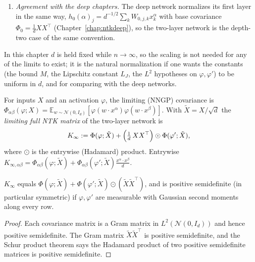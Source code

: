 \begin{remark}
\begin{enumerate}
  \item \emph{Agreement with the deep chapters.} The deep network normalizes its first layer in the same way, $h_0(\alpha)_j=d^{-1/2}\sum_kW_{0,j,k}x^\alpha_k$ with base
  covariance $\Phi_0=\tfrac1dXX^\top$ (Chapter~\ref{chap:ntkdeep}), so the two-layer network is the depth-two case of the same convention.
\end{enumerate}
In this chapter $d$ is held fixed while $n\to\infty$, so the scaling is not needed for any of the limits to exist; it is the natural normalization if one wants the constants
(the bound $M$, the Lipschitz constant $L_J$, the $L^2$ hypotheses on $\varphi,\varphi'$) to be uniform in $d$, and for comparing with the deep networks.
\end{remark}

\begin{definition}\label{def:ntktl:shallowLimitingNTK}
  \leanok
For inputs $X$ and an activation $\varphi$, the limiting (NNGP) covariance is $\Phi_{\alpha\beta}(\varphi;X)=\mathbb E_{w\sim\mathcal N(0,I_d)}[\varphi(w\cdot x^\alpha)\varphi(w\cdot x^\beta)]$. With $\tilde X=X/\sqrt d$ the
\emph{limiting full NTK matrix} of the two-layer network is
\[
  K_\infty:=\Phi(\varphi;\tilde X)+\Bigl(\tfrac1d\,XX^\top\Bigr)\odot\Phi(\varphi';\tilde X),
\]
where $\odot$ is the entrywise (Hadamard) product. Entrywise $K_{\infty,\alpha\beta}=\Phi_{\alpha\beta}(\varphi;\tilde X)+\Phi_{\alpha\beta}(\varphi';\tilde X)\frac{x^\alpha\cdot x^\beta}{d}$.
\end{definition}

\begin{theorem}\label{thm:ntktl:limitingProps}
  \leanok
$K_\infty$ equals $\Phi(\varphi;\tilde X)+\Phi(\varphi';\tilde X)\odot(\tilde X\tilde X^\top)$, and is positive semidefinite (in particular symmetric) if $\varphi,\varphi'$ are measurable with Gaussian second moments along every row.
\end{theorem}

\begin{proof}
  \leanok
Each covariance matrix is a Gram matrix in $L^2(\mathcal N(0,I_d))$ and hence positive semidefinite. The Gram matrix $\tilde X\tilde X^\top$ is positive semidefinite, and the Schur product theorem says the Hadamard product of two positive semidefinite
matrices is positive semidefinite.
\end{proof}

